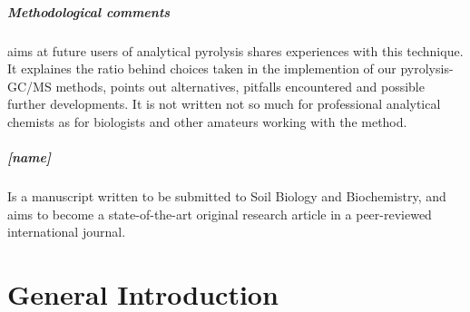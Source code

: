 \documentclass[a4paper,10pt]{book}
\begin{document}
\paragraph{Methodological comments} aims at future users of analytical pyrolysis shares experiences with this technique. It explaines the ratio behind choices taken in the implemention of our pyrolysis-GC/MS methods, points out alternatives, pitfalls encountered and possible further developments. It is not written not so much for professional analytical chemists as for biologists and other amateurs working with the method.

\paragraph{[name]}Is a manuscript written to be submitted to Soil Biology and Biochemistry, and aims to become a state-of-the-art original research article in a peer-reviewed international journal.




\chapter{General Introduction}


\newpage



% 
% 
% 
% 
% 
% 
% 
\end{document}
